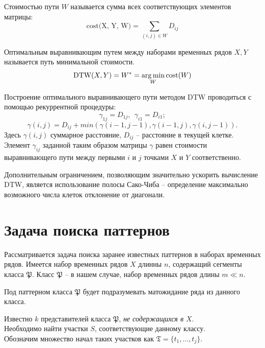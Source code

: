 \documentclass[12pt,twoside]{article}
\begin{document}
        \begin{Def}
            Стоимостью пути $W$ называется сумма всех соответствующих элементов матрицы:
            $$\text{cost(X, Y, W)} = \sum\limits_{(i, j)\in W} D_{ij}$$
        \end{Def}
        \begin{Def}
            Оптимальным выравнивающим путем между наборами временных рядов $X, Y$ называется путь минимальной стоимости. $$\text{DTW}(X, Y) = W^* = \argmin\limits_{W}\text{cost}(W)$$
        \end{Def}

        Построение оптимального выравнивающего пути методом DTW проводиться с помощью рекуррентной процедуры:
        $$\gamma_{1j} = D_{1j},\ \ \gamma_{i1} = D_{i1};$$
        $$\gamma(i, j) = D_{ij} + min({\gamma(i-1, j-1), \gamma(i-1, j), \gamma(i, j-1)}).$$
        Здесь $\gamma(i, j)$ суммарное расстояние, $D_{ij}$ \--- расстояние в текущей клетке. Элемент $\gamma_{ij}$ заданной таким образом матрицы $\gamma$ равен стоимости выравнивающего пути между первыми $i$ и $j$ точками $X$ и $Y$ соответственно.

        
        Дополнительным ограничением, позволяющим значительно ускорить вычисление DTW, является использование полосы Сако\--Чиба \--- определение максимально возможного числа клеток отклонение от диагонали.
                
    \label{sec:search}\section{Задача поиска паттернов}
        
        Рассматривается задача поиска заранее известных паттернов в наборах временных рядов.
        Имеется набор временных рядов $X$ длинны $n$, содержащий сегменты класса $\mathfrak{P}$.
        Класс $\mathfrak{P}$ \--- в нашем случае, набор временных рядов длины $m \ll n$. \\
        \begin{Def}{}
            Под паттерном класса $\mathfrak{P}$ будет подразумевать матожидание ряда из данного класса.
        \end{Def}
        
        Известно $k$ представителей класса $\mathfrak{P}$, \textit{не содержащихся в $X$}. \\
        Необходимо найти участки $S$, соответствующие данному классу. \\
        Обозначим множество начал таких участков как $\mathfrak{T} = \{t_1, \dots, t_j \}$.
\end{document}
